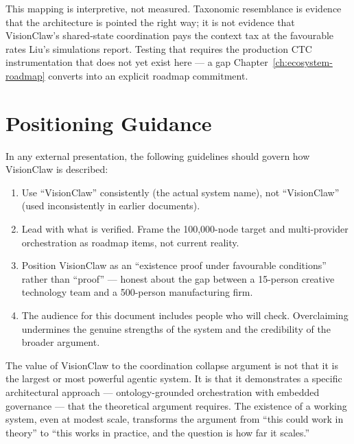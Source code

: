 This mapping is interpretive, not measured. Taxonomic resemblance is evidence that the architecture is pointed the right way; it is not evidence that VisionClaw's shared-state coordination pays the context tax at the favourable rates Liu's simulations report. Testing that requires the production CTC instrumentation that does not yet exist here --- a gap Chapter~\ref{ch:ecosystem-roadmap} converts into an explicit roadmap commitment.

\section{Positioning Guidance}

In any external presentation, the following guidelines should govern how VisionClaw is described:

\begin{enumerate}
  \item Use ``VisionClaw'' consistently (the actual system name), not ``VisionClaw'' (used inconsistently in earlier documents).
  \item Lead with what is verified. Frame the 100,000-node target and multi-provider orchestration as roadmap items, not current reality.
  \item Position VisionClaw as an ``existence proof under favourable conditions'' rather than ``proof'' --- honest about the gap between a 15-person creative technology team and a 500-person manufacturing firm.
  \item The audience for this document includes people who will check. Overclaiming undermines the genuine strengths of the system and the credibility of the broader argument.
\end{enumerate}

\begin{keyinsight}
The value of VisionClaw to the coordination collapse argument is not that it is the largest or most powerful agentic system. It is that it demonstrates a specific architectural approach --- ontology-grounded orchestration with embedded governance --- that the theoretical argument requires. The existence of a working system, even at modest scale, transforms the argument from ``this could work in theory'' to ``this works in practice, and the question is how far it scales.''
\end{keyinsight}
